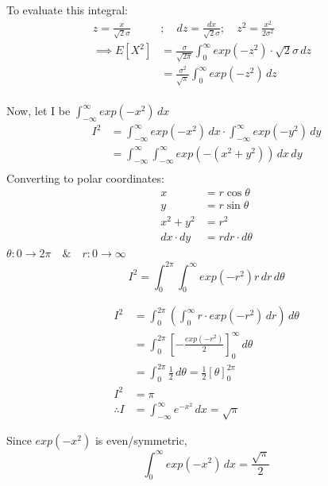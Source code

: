 \documentclass[12pt]{article}
\begin{document}
\noindent To evaluate this integral:
\begin{align*}
    z = \frac{x}{\sqrt{2}\sigma} &; \quad dz = \frac{dx}{\sqrt{2}\sigma} ; \quad z^2 = \frac{x^2}{2\sigma^2} & \\[10pt]
    \implies E[X^2] &= \frac{\sigma}{\sqrt{2\pi}} \int_{0}^{\infty} exp(-z^2) \cdot \sqrt{2}\sigma \, dz \\[10pt]
    &= \frac{\sigma^2}{\sqrt{\pi}} \int_{0}^{\infty} exp(-z^2) \, dz \\
\end{align*}

\noindent Now, let I be $\int_{-\infty}^{\infty} exp(-x^2) \, dx$ \\
\begin{align*}
    I^2 &= \int_{-\infty}^{\infty} exp(-x^2) \, dx \cdot \int_{-\infty}^{\infty} exp(-y^2) \, dy \\[10pt]
    &= \int_{-\infty}^{\infty} \int_{-\infty}^{\infty} exp(-(x^2 + y^2)) \, dx \, dy\\
\end{align*}
\noindent Converting to polar coordinates:
\begin{align*}
    x &= r \cos\theta\\
    y &= r \sin\theta \\
    x^2 + y^2 &= r^2\\
    dx \cdot dy &= r dr \cdot d\theta
\end{align*}
\noindent $\theta : 0 \to 2\pi \quad \& \quad r : 0 \to \infty$ \\
\[
I^2 = \int_{0}^{2\pi} \int_{0}^{\infty} exp(-r^2) r \, dr \, d\theta
\]

\begin{align*}
    I^2 &= \int_{0}^{2\pi} \left( \int_{0}^{\infty} r \cdot exp(-r^2) \, dr \right) \, d\theta \\[10pt]
    &= \int_{0}^{2\pi} \left[ -\frac{exp(-r^2)}{2} \right]_{0}^{\infty} \, d\theta \\[10pt]
    &= \int_{0}^{2\pi} \frac{1}{2} \, d\theta = \frac{1}{2} \left[ \theta \right]_{0}^{2\pi} \\[10pt]
    I^2 &= \pi \\[5pt]
    \therefore I &= \int_{-\infty}^{\infty} e^{-x^2} \, dx = \sqrt{\pi}
\end{align*}

\noindent Since $exp(-x^2)$ is even/symmetric,\\
\[
\int_{0}^{\infty} exp(-x^2) \, dx = \frac{\sqrt{\pi}}{2}
\]
\end{document}
